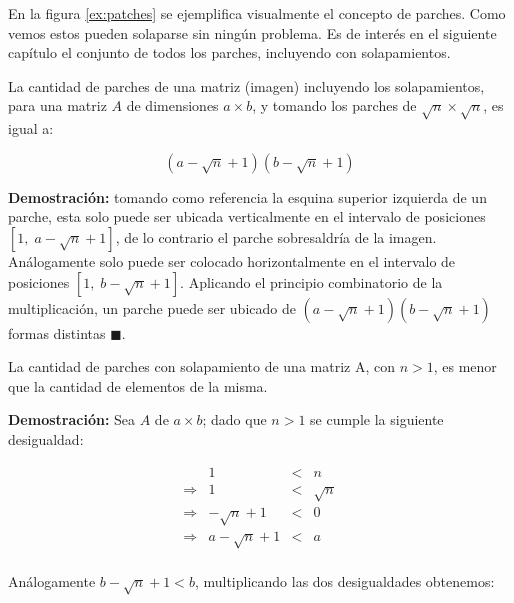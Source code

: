 En la figura \ref{ex:patches} se ejemplifica visualmente el concepto de parches. Como vemos estos pueden solaparse sin ning\'un problema. Es de inter\'es en el siguiente cap\'itulo el conjunto de todos los parches, incluyendo con solapamientos.

\begin{lemma}\label{le:count_patches}
	La cantidad de parches de una matriz (imagen) incluyendo los solapamientos, para una matriz $A$ de dimensiones $a \times b$, y tomando los parches de $\sqrt{n} \times \sqrt{n}$, es igual a:
	
	\begin{equation}
		(a - \sqrt{n} + 1)(b - \sqrt{n} + 1)
		\label{eq:count_patches}
	\end{equation}
\end{lemma}


\textbf{Demostraci\'on:} tomando como referencia la esquina superior izquierda de un parche, esta solo puede ser ubicada verticalmente en el intervalo de posiciones \\$[1,\; a - \sqrt{n} + 1]$, de lo contrario el parche sobresaldr\'ia de la imagen. An\'alogamente solo puede ser colocado horizontalmente en el intervalo de posiciones $[1,\; b - \sqrt{n} + 1]$. Aplicando el principio combinatorio de la multiplicaci\'on, un parche puede ser ubicado de $(a - \sqrt{n} + 1)(b - \sqrt{n} + 1)$ formas distintas $\blacksquare$.

\begin{lemma}\label{le:count_patches_ieq}
	La cantidad de parches con solapamiento de una matriz A, con $n > 1$, es menor que la cantidad de elementos de la misma.
\end{lemma}

\textbf{Demostraci\'on:} Sea $A$ de $a \times b$; dado que $n > 1$ se cumple la siguiente desigualdad:

\begin{equation}
	\begin{array}{lrcl}
		                &               1 &<& n        \\ 
		\Longrightarrow &               1 &<& \sqrt{n} \\
		\Longrightarrow &   -\sqrt{n} + 1 &<& 0        \\
		\Longrightarrow & a -\sqrt{n} + 1 &<& a        \\
	\end{array}
\end{equation}

An\'alogamente $b -\sqrt{n} + 1 < b$, multiplicando las dos desigualdades obtenemos:

